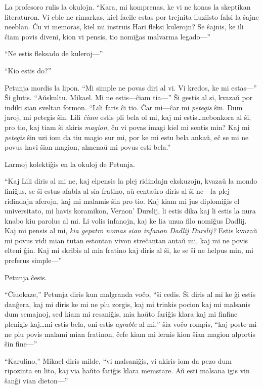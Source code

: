 La profesoro rulis la okulojn.
“Kara, mi komprenas, ke vi ne konas la skeptikan literaturon.
Vi eble ne rimarkas, kiel facile estas por trejnita iluziisto falsi la ŝajne neeblan.
Ĉu vi memoras, kiel mi instruis Hari fleksi kulerojn?
Se ŝajnis, ke ili ĉiam povis diveni, kion vi pensis, tio nomiĝas malvarma legado—”

“Ne estis fleksado de kuleroj—”

“Kio estis do?”

Petunja mordis la lipon.
“Mi simple ne povas diri al vi.
Vi kredos, ke mi estas—”
Ŝi glutis.
“Aŭskultu.
Mikael.
Mi ne estis—ĉiam tia—”
Ŝi gestis al si, kvazaŭ por indiki sian sveltan formon.
“Lili faris ĉi tio.
Ĉar mi—ĉar mi \emph{petegis} ŝin.
Dum jaroj, mi petegis ŝin.
Lili \emph{ĉiam} estis pli bela ol mi, kaj mi estis…nebonkora al ŝi, pro tio, kaj tiam ŝi akiris \emph{magion}, ĉu vi povas imagi kiel mi sentis min?
Kaj mi \emph{petegis} ŝin uzi iom da tiu magio sur mi, por ke mi estu bela ankaŭ, eĉ se mi ne povus havi ŝian magion, almenaŭ mi povus esti bela.”

Larmoj kolektiĝis en la okuloj de Petunja.

“Kaj Lili diris al mi ne, kaj elpensis la plej ridindajn ekskuzojn, kvazaŭ la mondo finiĝus, se ŝi estus afabla al sia fratino, aŭ centaŭro diris al ŝi ne—la plej ridindajn aferojn, kaj mi malamis ŝin pro tio.
Kaj kiam mi ĵus diplomiĝis el universitato, mi havis koramikon, Vernon’ Durslij, li estis dika kaj li estis la nura knabo kiu parolus al mi.
Li volis infanojn, kaj ke lia unua filo nomiĝus Dadlij.
Kaj mi pensis al mi, \emph{kia gepatro nomas sian infanon Dadlij Durslij?}
Estis kvazaŭ mi povus vidi mian tutan estontan vivon streĉantan antaŭ mi, kaj mi ne povis elteni ĝin.
Kaj mi skribis al mia fratino kaj diris al ŝi, ke se ŝi ne helpus min, mi preferus simple—”

Petunja ĉesis.

“Ĉiuokaze,” Petunja diris kun malgranda voĉo, “ŝi cedis.
Ŝi diris al mi ke ĝi estis danĝera, kaj mi diris ke mi ne plu zorgis, kaj mi trinkis pocion kaj mi malsanis dum semajnoj, sed kiam mi resaniĝis, mia haŭto fariĝis klara kaj mi finfine plenigis kaj…mi estis bela, oni estis \emph{agrable} al mi,” ŝia voĉo rompis, “kaj poste mi ne plu povis malami mian fratinon, ĉefe kiam mi lernis kion ŝian magion alportis ŝin fine—”

“Karulino,” Mikael diris milde, “vi malsaniĝis, vi akiris iom da pezo dum ripozinta en lito, kaj via haŭto fariĝis klara memstare.
Aŭ esti malsana igis vin ŝanĝi vian dieton—”

